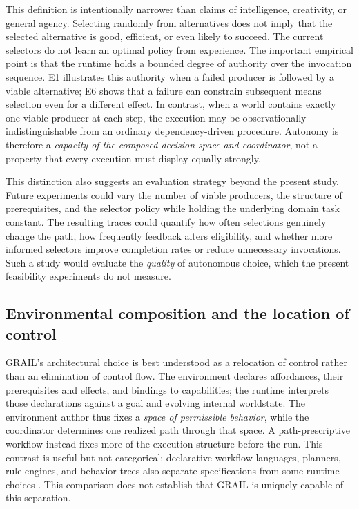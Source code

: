 \documentclass[11pt]{article}
\begin{document}
This definition is intentionally narrower than claims of intelligence, creativity, or general agency. Selecting randomly from alternatives does not imply that the selected alternative is good, efficient, or even likely to succeed. The current selectors do not learn an optimal policy from experience. The important empirical point is that the runtime holds a bounded degree of authority over the invocation sequence. E1 illustrates this authority when a failed producer is followed by a viable alternative; E6 shows that a failure can constrain subsequent means selection even for a different effect. In contrast, when a world contains exactly one viable producer at each step, the execution may be observationally indistinguishable from an ordinary dependency-driven procedure. Autonomy is therefore a \emph{capacity of the composed decision space and coordinator}, not a property that every execution must display equally strongly.

This distinction also suggests an evaluation strategy beyond the present study. Future experiments could vary the number of viable producers, the structure of prerequisites, and the selector policy while holding the underlying domain task constant. The resulting traces could quantify how often selections genuinely change the path, how frequently feedback alters eligibility, and whether more informed selectors improve completion rates or reduce unnecessary invocations. Such a study would evaluate the \emph{quality} of autonomous choice, which the present feasibility experiments do not measure.

\subsection{Environmental composition and the location of control}
GRAIL's architectural choice is best understood as a relocation of control rather than an elimination of control flow. The environment declares affordances, their prerequisites and effects, and bindings to capabilities; the runtime interprets those declarations against a goal and evolving internal worldstate. The environment author thus fixes a \emph{space of permissible behavior}, while the coordinator determines one realized path through that space. A path-prescriptive workflow instead fixes more of the execution structure before the run. This contrast is useful but not categorical: declarative workflow languages, planners, rule engines, and behavior trees also separate specifications from some runtime choices \cite{Aalst2003,FikesNilsson1971,Colledanchise2018}. This comparison does not establish that GRAIL is uniquely capable of this separation.
\end{document}
